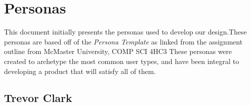 \documentclass[10pt]{article}
\begin{document}
\section*{Personas}\vspace{2mm}

This document initially presents the personas used to develop our design.These personas are based off of the \emph{Persona Template} as linked from the assignment outline from McMaster University, COMP SCI 4HC3 These personas were created to archetype the most common user types, and have been integral to developing a product that will satisfy all of them.\\

%


\subsection*{Trevor Clark}
\vspace{4mm}
\end{document}
